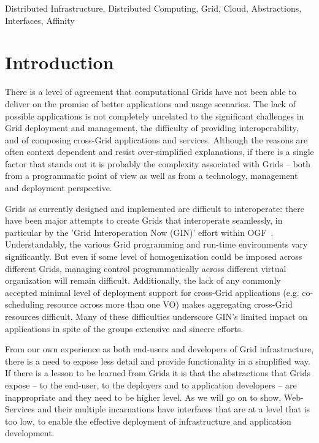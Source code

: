 \documentclass[conference,final]{IEEEtran}
\begin{document}
\begin{IEEEkeywords}
  Distributed Infrastructure, Distributed Computing, Grid,
  Cloud, Abstractions, Interfaces, Affinity
\end{IEEEkeywords}


\section{Introduction}

 There is a level of agreement that computational Grids have not been
 able to deliver on the promise of better applications and usage
 scenarios.  The lack of possible applications is not completely
 unrelated to the significant challenges in Grid deployment and
 management, the difficulty of providing interoperability, and of
 composing cross-Grid applications and services.  Although the reasons
 are often context dependent and resist over-simplified explanations,
 if there is a single factor that stands out it is probably the
 complexity associated with Grids -- both from a programmatic point of
 view as well as from a technology, management and deployment
 perspective.

 Grids as currently designed and implemented are difficult to
 interoperate: there have been major attempts to create Grids that
 interoperate seamlessly, in particular by the 'Grid Interoperation
 Now (GIN)' effort within OGF~\cite{gin}.  Understandably, the various
 Grid programming and run-time environments vary significantly.  But
 even if some level of homogenization could be imposed across
 different Grids, managing control programmatically across different
 virtual organization will remain difficult.  Additionally, the lack
 of any commonly accepted minimal level of deployment support for
 cross-Grid applications (e.g.  co-scheduling resource across more
 than one VO) makes aggregating cross-Grid resources difficult. Many
 of these difficulties underscore GIN's limited impact on applications
 in spite of the groups extensive and sincere efforts.

 From our own experience as both end-users and developers of Grid
 infrastructure, there is a need to expose less detail and provide
 functionality in a simplified way.  If there is a lesson to be learned
 from Grids it is that the abstractions that Grids expose -- to the
 end-user, to the deployers and to application developers -- are
 inappropriate and they need to be higher level.  As we will go on to
 show, Web-Services and their multiple incarnations have interfaces
 that are at a level that is too low, to enable the effective
 deployment of infrastructure and application development.
\end{document}
